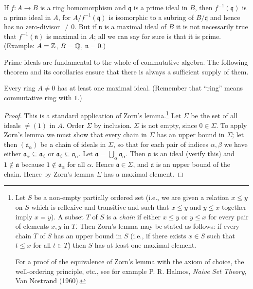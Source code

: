 If $f \colon A \to B$ is a ring homomorphism and $\mathfrak{q}$ is a prime ideal in $B$, then $f^{-1}(\mathfrak{q})$ is a prime ideal in $A$, for $A/f^{-1}(\mathfrak{q})$ is isomorphic to a subring of $B/\mathfrak{q}$ and hence has no zero-divisor $\neq 0$. But if $\mathfrak{n}$ is a maximal ideal of $B$ it is not necessarily true that $f^{-1}(\mathfrak{n})$ is maximal in $A$; all we can say for sure is that it is prime. (Example: $A = \mathbb{Z}$, $B = \mathbb{Q}$, $\mathfrak{n} = 0$.)

Prime ideals are fundamental to the whole of commutative algebra. The following theorem and its corollaries ensure that there is always a sufficient supply of them.

\begin{theorem}\label{thm:maximal-ideal-exists}
Every ring $A \neq 0$ has at least one maximal ideal. (Remember that ``ring'' means commutative ring with $1$.)
\end{theorem}

\begin{proof}
This is a standard application of Zorn's lemma.\footnote{Let $S$ be a non-empty partially ordered set (i.e., we are given a relation $x \leq y$ on $S$ which is reflexive and transitive and such that $x \leq y$ and $y \leq x$ together imply $x = y$). A subset $T$ of $S$ is a \emph{chain} if either $x \leq y$ or $y \leq x$ for every pair of elements $x, y$ in $T$. Then Zorn's lemma may be stated as follows: if every chain $T$ of $S$ has an upper bound in $S$ (i.e., if there exists $x \in S$ such that $t \leq x$ for all $t \in T$) then $S$ has at least one maximal element.

For a proof of the equivalence of Zorn's lemma with the axiom of choice, the well-ordering principle, etc., see for example P. R. Halmos, \emph{Naive Set Theory}, Van Nostrand (1960).} Let $\Sigma$ be the set of all ideals $\neq (1)$ in $A$. Order $\Sigma$ by inclusion. $\Sigma$ is not empty, since $0 \in \Sigma$. To apply Zorn's lemma we must show that every chain in $\Sigma$ has an upper bound in $\Sigma$; let then $(\mathfrak{a}_\alpha)$ be a chain of ideals in $\Sigma$, so that for each pair of indices $\alpha, \beta$ we have either $\mathfrak{a}_\alpha \subseteq \mathfrak{a}_\beta$ or $\mathfrak{a}_\beta \subseteq \mathfrak{a}_\alpha$. Let $\mathfrak{a} = \bigcup_\alpha \mathfrak{a}_\alpha$. Then $\mathfrak{a}$ is an ideal (verify this) and $1 \notin \mathfrak{a}$ because $1 \notin \mathfrak{a}_\alpha$ for all $\alpha$. Hence $\mathfrak{a} \in \Sigma$, and $\mathfrak{a}$ is an upper bound of the chain. Hence by Zorn's lemma $\Sigma$ has a maximal element.
\end{proof}

